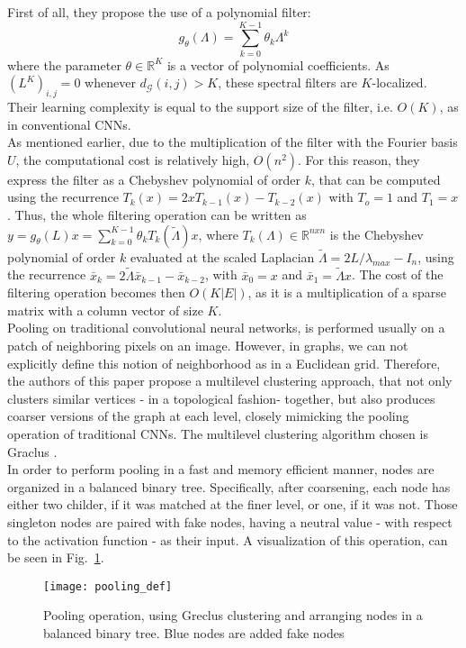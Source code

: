  First of all, they propose the use of a polynomial filter:\\
\begin{equation}
g_{\theta}(\Lambda ) = \sum_{k=0}^{K-1}\theta_k \Lambda^k
\end{equation}
where the parameter $\theta \in \mathbb{R}^K$ is a vector of polynomial
coefficients. As $(L^K)_{i,j} = 0$ whenever $d_{\mathcal{G}}(i,j)>K$, these
spectral filters are $K$-localized.\\

 Their learning complexity is equal to the support
size of the filter, i.e. $O(K)$, as in conventional CNNs.\\

 As mentioned earlier, due to the
multiplication of the filter with the Fourier basis $U$, the computational cost
is relatively high, $O(n^2)$. For this reason, they express the filter as a
Chebyshev polynomial of order $k$, that can be computed using the recurrence
$T_k(x) = 2xT_{k-1}(x)-T_{k-2}(x)$ with $T_o = 1$ and $T_1 = x$. Thus, the whole
filtering operation can be written as $y = g_{\theta}(L)x =
\sum_{k=0}^{K-1}\theta_k T_k (\widetilde{\Lambda })x$, where $T_k (\Lambda ) \in
\mathbb{R}^{nxn}$ is the Chebyshev polynomial of order $k$ evaluated at the
scaled Laplacian $\widetilde{\Lambda} = 2L/\lambda_{max} - I_n$, using the
recurrence $\bar{x}_k = 2\widetilde{\Lambda}\bar{x}_{k-1} - \bar{x}_{k-2}$, with
$\bar{x}_0 = x$ and $\bar{x}_1 = \widetilde{\Lambda}x$. The cost of the
filtering operation becomes then $O(K|E|)$, as it is a multiplication of a
sparse matrix with a column vector of size $K$.\\

Pooling on traditional convolutional neural networks, is performed usually on a
patch of neighboring pixels on an image. However, in graphs, we can not explicitly
define this notion of neighborhood as in a Euclidean grid. Therefore, the authors of
this paper propose a multilevel clustering approach, that not only clusters
similar vertices - in a topological fashion- together, but also produces coarser
versions of the graph at each level, closely mimicking the pooling operation of traditional
CNNs. The multilevel clustering algorithm chosen is Graclus \cite{Kulis}.\\
In order to perform pooling in a fast and memory efficient manner, nodes are
organized in a balanced binary tree. Specifically, after coarsening, each node
has either two childer, if it was matched at the finer level, or one, if it was
not. Those singleton nodes are paired with fake nodes, having a neutral value
- with respect to the activation function - as their input. A visualization of this
operation, can be seen in Fig.~\ref{pooldef}.
\begin{figure}
\texttt{[image: pooling\_def]}
\caption{Pooling operation, using Greclus clustering and arranging nodes in a
balanced binary tree. Blue nodes are added fake nodes}
\label{pooldef}
\end{figure}
